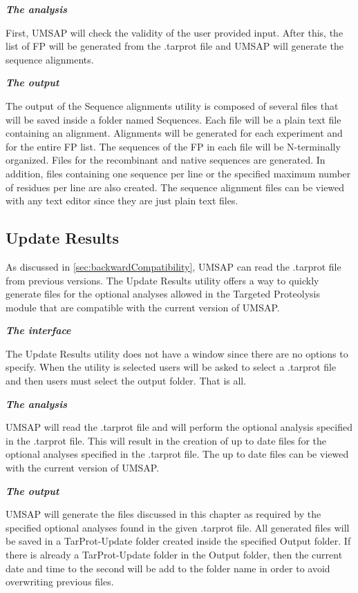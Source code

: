 \textit{\textbf{The analysis}}

First, UMSAP will check the validity of the user provided input. After this, the list of FP will be generated from the .tarprot file and UMSAP will generate the sequence alignments.

\textit{\textbf{The output}}

The output of the Sequence alignments utility is composed of several files that will be saved inside a folder named Sequences. Each file will be a plain text file containing an alignment. Alignments will be generated for each experiment and for the entire FP list. The sequences of the FP in each file will be N-terminally organized. Files for the recombinant and native sequences are generated. In addition, files containing one sequence per line or the specified maximum number of residues per line are also created. The sequence alignment files can be viewed with any text editor since they are just plain text files.

\subsection{Update Results}
\label{subsec:utilUpdateRes}

As discussed in \autoref{sec:backwardCompatibility}, UMSAP can read the .tarprot file from previous versions. The Update Results utility offers a way to quickly generate files for the optional analyses allowed in the Targeted Proteolysis module that are compatible with the current version of UMSAP.

\textit{\textbf{The interface}}

The Update Results utility does not have a window since there are no options to specify. When the utility is selected users will be asked to select a .tarprot file and then users must select the output folder. That is all.

\textit{\textbf{The analysis}}

UMSAP will read the .tarprot file and will perform the optional analysis specified in the .tarprot file. This will result in the creation of up to date files for the optional analyses specified in the .tarprot file. The up to date files can be viewed with the current version of UMSAP.

\textit{\textbf{The output}}

UMSAP will generate the files discussed in this chapter as required by the specified optional analyses found in the given .tarprot file. All generated files will be saved in a TarProt-Update folder created inside the specified Output folder. If there is already a TarProt-Update folder in the Output folder, then the current date and time to the second will be add to the folder name in order to avoid overwriting previous files. 

